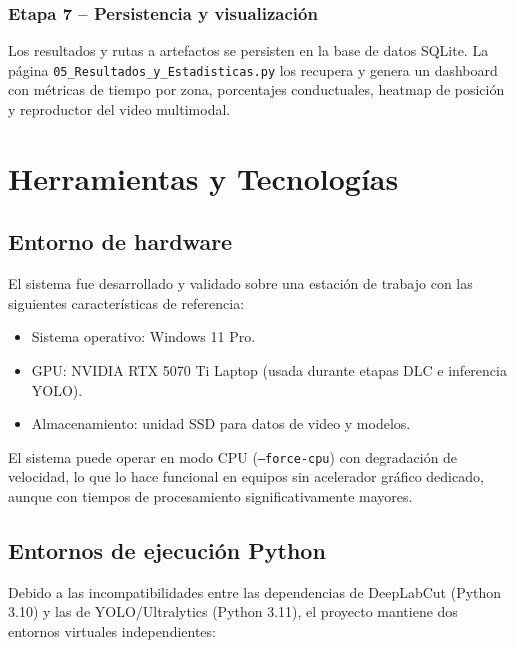 \documentclass[12pt]{report}
\begin{document}
\subsection{Etapa 7 -- Persistencia y visualización}

Los resultados y rutas a artefactos se persisten en la base de datos SQLite.
La página \texttt{05\_Resultados\_y\_Estadisticas.py} los recupera y genera
un dashboard con métricas de tiempo por zona, porcentajes conductuales,
heatmap de posición y reproductor del video multimodal.

\chapter{Herramientas y Tecnologías}

\section{Entorno de hardware}

El sistema fue desarrollado y validado sobre una estación de trabajo con las
siguientes características de referencia:

\begin{itemize}[leftmargin=*]
    \item Sistema operativo: Windows 11 Pro.
    \item GPU: NVIDIA RTX 5070 Ti Laptop (usada durante etapas DLC e inferencia YOLO).
    \item Almacenamiento: unidad SSD para datos de video y modelos.
\end{itemize}

El sistema puede operar en modo CPU (\texttt{--force-cpu}) con degradación de
velocidad, lo que lo hace funcional en equipos sin acelerador gráfico dedicado,
aunque con tiempos de procesamiento significativamente mayores.

\section{Entornos de ejecución Python}

Debido a las incompatibilidades entre las dependencias de DeepLabCut (Python 3.10)
y las de YOLO/Ultralytics (Python 3.11), el proyecto mantiene dos entornos
virtuales independientes:
\end{document}
